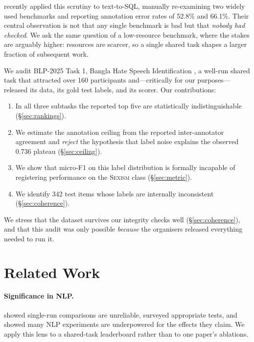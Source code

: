 \documentclass[11pt]{article}
\begin{document}
\citet{jin2026broken} recently applied this scrutiny to text-to-SQL, manually
re-examining two widely used benchmarks and reporting annotation error rates of
52.8\% and 66.1\%. Their central observation is not that any single benchmark is
bad but that \emph{nobody had checked}. We ask the same question of a
low-resource benchmark, where the stakes are arguably higher: resources are
scarcer, so a single shared task shapes a larger fraction of subsequent work.

We audit BLP-2025 Task 1, Bangla Hate Speech Identification
\citep{hasan2025blptask1}, a well-run shared task that attracted over 160
participants and---critically for our purposes---released its data, its gold test
labels, and its scorer. Our contributions:

\begin{enumerate}\itemsep2pt
\item In all three subtasks the reported top five are statistically
      indistinguishable (\S\ref{sec:rankings}).
\item We estimate the annotation ceiling from the reported inter-annotator
      agreement and \emph{reject} the hypothesis that label noise explains the
      observed 0.736 plateau (\S\ref{sec:ceiling}).
\item We show that micro-F1 on this label distribution is formally incapable of
      registering performance on the \textsc{Sexism} class
      (\S\ref{sec:metric}).
\item We identify 342 test items whose labels are internally inconsistent
      (\S\ref{sec:coherence}).
\end{enumerate}

We stress that the dataset survives our integrity checks well
(\S\ref{sec:coherence}), and that this audit was only possible \emph{because}
the organisers released everything needed to run it.

\section{Related Work}

\paragraph{Significance in NLP.} \citet{reimers2017reporting} showed single-run
comparisons are unreliable, \citet{dror2018hitchhiker} surveyed appropriate
tests, and \citet{card2020power} showed many NLP experiments are underpowered for
the effects they claim. We apply this lens to a shared-task leaderboard rather
than to one paper's ablations.
\end{document}
